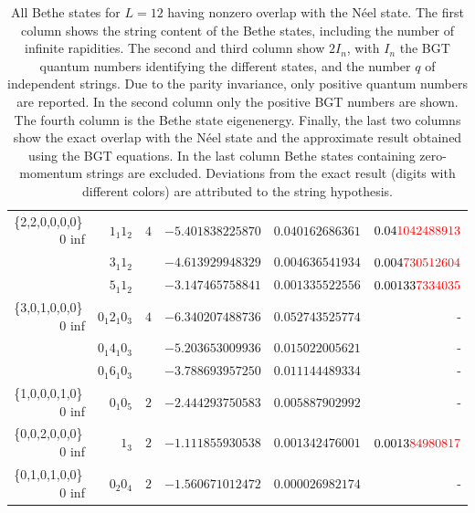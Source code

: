 \documentclass[11pt]{iopart}
\begin{document}
\begin{table}[ht]
\begin{tabular}{rrrrrr}
\midrule
\{2,2,0,0,0,0\}\, 0 inf &$1_1 1_2$ & $4$ & $-5.401838225870$ & $0.040162686361$ & $0.04{\color{red}1042488913}$\\  
&$3_1 1_2 $ & & $-4.613929948329$ & $0.004636541934$ & $0.004{\color{red}730512604}$\\
  &$5_1 1_2 $ &  & $-3.147465758841$ & $0.001335522556$ & $0.00133{\color{red}7334035}$\\
\midrule
\{3,0,1,0,0,0\}\, 0 inf &$0_1 2_1 0_3$ & $4$ & $-6.340207488736$ & $0.052743525774$ & -\\
  &$0_1 4_1 0_3$ & & $-5.203653009936$ & $0.015022005621$ & - \\
  &$0_1 6_1 0_3$ & & $-3.788693957250$ & $0.011144489334$ & - \\
\midrule
\{1,0,0,0,1,0\}\, 0 inf &$0_1 0_5$ & $2$ & $-2.444293750583$ & $0.005887902992$ & - \\
\midrule
\{0,0,2,0,0,0\}\, 0 inf &$1_3$ & $2$ & $-1.111855930538$ & $0.001342476001$ & $0.0013{\color{red}84980817}$ \\
\midrule
\{0,1,0,1,0,0\}\, 0 inf &$0_2 0_4$ & $2$ &  $-1.560671012472$ & $0.000026982174$ & - \\
\bottomrule
\end{tabular}
\caption{All Bethe states for $L=12$ having nonzero overlap with the  N\'eel state. 
 The first column shows the string content of the Bethe states, including the number of infinite 
 rapidities. The second and third column show $2I_n$, with $I_n$ the BGT quantum numbers 
 identifying the different states, and the number $q$ of independent strings. Due to the parity invariance, 
 only positive quantum numbers are reported. In the second 
 column only the positive BGT numbers are shown. The fourth column is the Bethe state eigenenergy. 
 Finally, the last two columns show the exact overlap with the N\'eel state and the approximate 
 result obtained using the BGT equations. In the last column Bethe states containing zero-momentum 
 strings are excluded. Deviations from the exact result (digits with different colors) are 
 attributed to the string hypothesis. 
}
\label{table:Neel}
\end{table}
\end{document}
